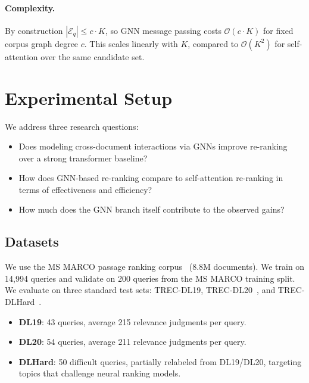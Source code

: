 \documentclass[runningheads]{llncs}
\begin{document}
\paragraph{Complexity.} By construction $|\mathcal{E}_q| \leq c \cdot K$, so GNN message passing costs $\mathcal{O}(c \cdot K)$ for fixed corpus graph degree $c$. This scales linearly with $K$, compared to $\mathcal{O}(K^2)$ for self-attention over the same candidate set.

\section{Experimental Setup}
We address three research questions:
\begin{itemize}[leftmargin=1.1cm]
\item[\textbf{RQ1.}] Does modeling cross-document interactions via GNNs improve re-ranking over a strong transformer baseline?
\item[\textbf{RQ2.}] How does GNN-based re-ranking compare to self-attention re-ranking in terms of effectiveness and efficiency?
\item[\textbf{RQ3.}] How much does the GNN branch itself contribute to the observed gains?
\end{itemize}

\subsection{Datasets}
We use the MS MARCO passage ranking corpus~\cite{msmarco} (8.8M documents). We train on 14,994 queries and validate on 200 queries from the MS MARCO training split. We evaluate on three standard test sets: TREC-DL19, TREC-DL20~\cite{dl19-20}, and TREC-DLHard~\cite{dl-hard}.
\begin{itemize}
    \item \textbf{DL19}: 43 queries, average 215 relevance judgments per query.
    \item \textbf{DL20}: 54 queries, average 211 relevance judgments per query.
    \item \textbf{DLHard}: 50 difficult queries, partially relabeled from DL19/DL20, targeting topics that challenge neural ranking models.
\end{itemize}
\end{document}
